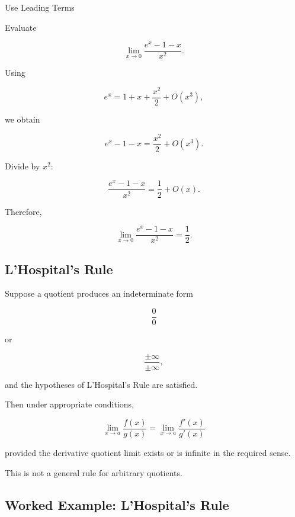 \begin{workedexamplebox}{Use Leading Terms}

Evaluate

\[
\lim_{x\to0}
\frac{
e^x-1-x
}{
x^2
}.
\]

Using

\[
e^x
=
1+x+\frac{x^2}{2}
+
O(x^3),
\]

we obtain

\[
e^x-1-x
=
\frac{x^2}{2}
+
O(x^3).
\]

Divide by \(x^2\):

\[
\frac{
e^x-1-x
}{
x^2
}
=
\frac12+O(x).
\]

Therefore,

\begin{answerbox}
\[
\boxed{
\lim_{x\to0}
\frac{
e^x-1-x
}{
x^2
}
=
\frac12.
}
\]
\end{answerbox}

\end{workedexamplebox}

\subsection{L'Hospital's Rule}
\label{subsec:lhospital-reference}

Suppose a quotient produces an indeterminate form

\[
\frac00
\]

or

\[
\frac{\pm\infty}{\pm\infty},
\]

and the hypotheses of L'Hospital's Rule are satisfied.

Then under appropriate conditions,

\[
\boxed{
\lim_{x\to a}
\frac{f(x)}{g(x)}
=
\lim_{x\to a}
\frac{f'(x)}{g'(x)}
}
\]

provided the derivative quotient limit exists or is infinite in the required
sense.

This is not a general rule for arbitrary quotients.

\subsection{Worked Example: L'Hospital's Rule}
\label{subsec:worked-lhospital}

